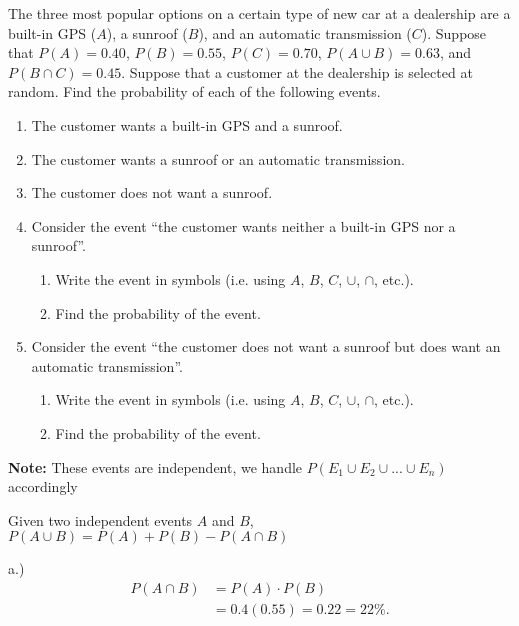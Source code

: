 \documentclass{report}
\begin{document}
    \pagebreak \bigbreak \noindent 
    \begin{mdframed}
        The three most popular options on a certain type of new car at a dealership are a built-in GPS (\( A \)), a sunroof (\( B \)), and an automatic transmission (\( C \)). Suppose that \( P(A) = 0.40 \), \( P(B) = 0.55 \), \( P(C) = 0.70 \), \( P(A \cup B) = 0.63 \), and \( P(B \cap C) = 0.45 \). Suppose that a customer at the dealership is selected at random. Find the probability of each of the following events.
        \begin{enumerate}[label=(\alph*)]
            \item The customer wants a built-in GPS and a sunroof. 
            \item The customer wants a sunroof or an automatic transmission. 
            \item The customer does not want a sunroof. 
            \item Consider the event “the customer wants neither a built-in GPS nor a sunroof”.
                \begin{enumerate}[label=(\roman*)]
                    \item Write the event in symbols (i.e. using \( A \), \( B \), \( C \), \( \cup \), \( \cap \), etc.). 
                    \item Find the probability of the event. 
                \end{enumerate}
            \item Consider the event “the customer does not want a sunroof but does want an automatic transmission”.
                \begin{enumerate}[label=(\roman*)]
                    \item Write the event in symbols (i.e. using \( A \), \( B \), \( C \), \( \cup \), \( \cap \), etc.). 
                    \item Find the probability of the event. 
                \end{enumerate}
        \end{enumerate}
    \end{mdframed}
    \bigbreak \noindent 
    \textbf{Note:} These events are independent, we handle $P(E_{1} \cup E_{2} \cup ...\cup E_{n})$ accordingly
    \bigbreak \noindent 
    \begin{remark}
        Given two independent events $A$ and $B$, $P(A \cup B) = P(A) + P(B) - P(A\cap B)$ 
    \end{remark}
    \bigbreak \noindent 
    a.) 
    \begin{align*}
        P(A \cap B) &= P(A) \cdot  P(B) \\
        &= 0.4(0.55) = 0.22 = 22\%
    .\end{align*}
    
\end{document}
